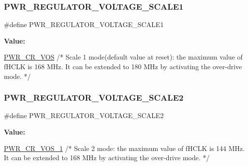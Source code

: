 \subsubsection{\texorpdfstring{P\+W\+R\+\_\+\+R\+E\+G\+U\+L\+A\+T\+O\+R\+\_\+\+V\+O\+L\+T\+A\+G\+E\+\_\+\+S\+C\+A\+L\+E1}{PWR\_REGULATOR\_VOLTAGE\_SCALE1}}
{\footnotesize\ttfamily \#define P\+W\+R\+\_\+\+R\+E\+G\+U\+L\+A\+T\+O\+R\+\_\+\+V\+O\+L\+T\+A\+G\+E\+\_\+\+S\+C\+A\+L\+E1}

{\bfseries Value\+:}
\begin{DoxyCode}
\mbox{\hyperlink{group___peripheral___registers___bits___definition_gaccc33f1ba4e374e116ffa50f3a503030}{PWR\_CR\_VOS}}             \textcolor{comment}{/* Scale 1 mode(default value at reset): the maximum value of fHCLK is 168
       MHz. It can be extended to}
\textcolor{comment}{                                                                       180 MHz by activating the over-drive
       mode. */}
\end{DoxyCode}
\mbox{\label{group___p_w_r_ex___regulator___voltage___scale_gaa0d38e304a0adfdbb58a61c96bdb95e9}} 
\subsubsection{\texorpdfstring{P\+W\+R\+\_\+\+R\+E\+G\+U\+L\+A\+T\+O\+R\+\_\+\+V\+O\+L\+T\+A\+G\+E\+\_\+\+S\+C\+A\+L\+E2}{PWR\_REGULATOR\_VOLTAGE\_SCALE2}}
{\footnotesize\ttfamily \#define P\+W\+R\+\_\+\+R\+E\+G\+U\+L\+A\+T\+O\+R\+\_\+\+V\+O\+L\+T\+A\+G\+E\+\_\+\+S\+C\+A\+L\+E2}

{\bfseries Value\+:}
\begin{DoxyCode}
\mbox{\hyperlink{group___peripheral___registers___bits___definition_gac3093c26b256c965cebec3b2e388a3b4}{PWR\_CR\_VOS\_1}}           \textcolor{comment}{/* Scale 2 mode: the maximum value of fHCLK is 144 MHz. It can be
       extended to}
\textcolor{comment}{                                                                       168 MHz by activating the over-drive
       mode. */}
\end{DoxyCode}
